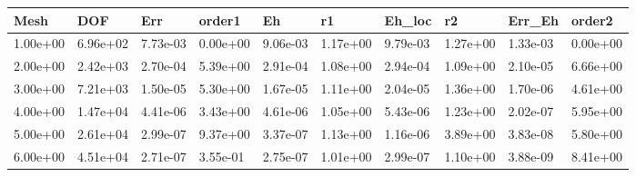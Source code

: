 \begin{tabular}{llllllllll}
Mesh & DOF & Err & order1 & Eh & r1 & Eh_loc & r2 & Err_Eh & order2 \\ 
\hline 
1.00e+00 & 6.96e+02 & 7.73e-03 & 0.00e+00 & 9.06e-03 & 1.17e+00 & 9.79e-03 & 1.27e+00 & 1.33e-03 & 0.00e+00 \\ 
2.00e+00 & 2.42e+03 & 2.70e-04 & 5.39e+00 & 2.91e-04 & 1.08e+00 & 2.94e-04 & 1.09e+00 & 2.10e-05 & 6.66e+00 \\ 
3.00e+00 & 7.21e+03 & 1.50e-05 & 5.30e+00 & 1.67e-05 & 1.11e+00 & 2.04e-05 & 1.36e+00 & 1.70e-06 & 4.61e+00 \\ 
4.00e+00 & 1.47e+04 & 4.41e-06 & 3.43e+00 & 4.61e-06 & 1.05e+00 & 5.43e-06 & 1.23e+00 & 2.02e-07 & 5.95e+00 \\ 
5.00e+00 & 2.61e+04 & 2.99e-07 & 9.37e+00 & 3.37e-07 & 1.13e+00 & 1.16e-06 & 3.89e+00 & 3.83e-08 & 5.80e+00 \\ 
6.00e+00 & 4.51e+04 & 2.71e-07 & 3.55e-01 & 2.75e-07 & 1.01e+00 & 2.99e-07 & 1.10e+00 & 3.88e-09 & 8.41e+00 \\ 
\hline 
\end{tabular}